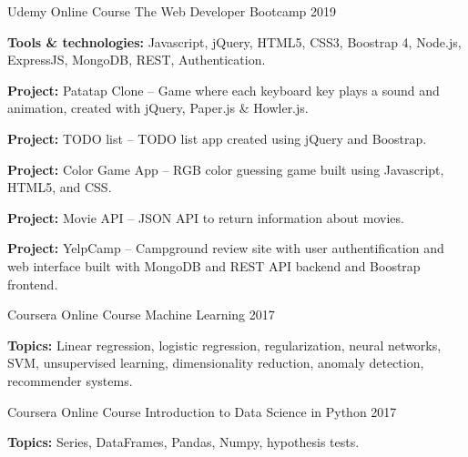 


\begin{cventries}

\cventry
{Udemy Online Course} %
{The Web Developer Bootcamp} %
{} %
{2019} %
{ %
\begin{cvitems}
\item {\textbf{Tools \& technologies:} Javascript, jQuery, HTML5, CSS3, Boostrap 4, Node.js, ExpressJS, MongoDB, REST, Authentication. }
\item {\textbf{Project:} Patatap Clone -- Game where each keyboard key plays a sound and animation, created with jQuery, Paper.js \& Howler.js.}
\item{\textbf{Project:} TODO list -- TODO list app created using jQuery and Boostrap.}
\item{\textbf{Project:} Color Game App -- RGB color guessing game built using Javascript, HTML5, and CSS.}
\item{\textbf{Project:} Movie API -- JSON API to return information about movies.}
\item{\textbf{Project:} YelpCamp -- Campground review site with user authentification and web interface built with MongoDB and REST API backend and Boostrap frontend.\\}
\end{cvitems}
}

\cventry
{Coursera Online Course} %
{Machine Learning} %
{} %
{2017} %
{ %
\begin{cvitems}
\item {\textbf{Topics:} Linear regression, logistic regression, regularization, neural networks, SVM, unsupervised learning, dimensionality reduction, anomaly detection, recommender systems.\\ }
\end{cvitems}
}

\cventry
{Coursera Online Course} %
{Introduction to Data Science in Python} %
{} %
{2017} %
{ %
\begin{cvitems}
\item {\textbf{Topics:} Series, DataFrames, Pandas, Numpy, hypothesis tests. }
\end{cvitems}
}



\end{cventries}